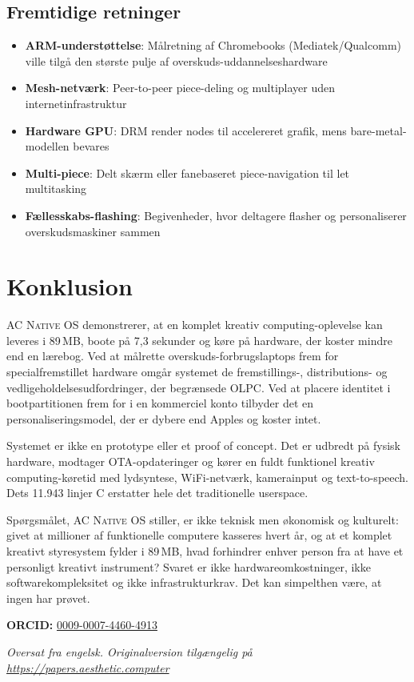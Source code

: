 \documentclass[10pt,letterpaper,twocolumn]{article}
\newcommand{\acos}{\textsc{AC Native OS}}
\begin{document}
\subsection{Fremtidige retninger}

\begin{itemize}
  \item \textbf{ARM-understøttelse}: Målretning af Chromebooks (Mediatek/Qualcomm) ville tilgå den største pulje af overskuds-uddannelseshardware
  \item \textbf{Mesh-netværk}: Peer-to-peer piece-deling og multiplayer uden internetinfrastruktur
  \item \textbf{Hardware GPU}: DRM render nodes til accelereret grafik, mens bare-metal-modellen bevares
  \item \textbf{Multi-piece}: Delt skærm eller fanebaseret piece-navigation til let multitasking
  \item \textbf{Fællesskabs-flashing}: Begivenheder, hvor deltagere flasher og personaliserer overskudsmaskiner sammen
\end{itemize}

\section{Konklusion}

\acos{} demonstrerer, at en komplet kreativ computing-oplevelse kan leveres i 89\,MB, boote på 7,3 sekunder og køre på hardware, der koster mindre end en lærebog. Ved at målrette overskuds-forbrugslaptops frem for specialfremstillet hardware omgår systemet de fremstillings-, distributions- og vedligeholdelsesudfordringer, der begrænsede OLPC. Ved at placere identitet i bootpartitionen frem for i en kommerciel konto tilbyder det en personaliseringsmodel, der er dybere end Apples og koster intet.

Systemet er ikke en prototype eller et proof of concept. Det er udbredt på fysisk hardware, modtager OTA-opdateringer og kører en fuldt funktionel kreativ computing-køretid med lydsyntese, WiFi-netværk, kamerainput og text-to-speech. Dets 11.943 linjer C erstatter hele det traditionelle userspace.

Spørgsmålet, \acos{} stiller, er ikke teknisk men økonomisk og kulturelt: givet at millioner af funktionelle computere kasseres hvert år, og at et komplet kreativt styresystem fylder i 89\,MB, hvad forhindrer enhver person fra at have et personligt kreativt instrument? Svaret er ikke hardwareomkostninger, ikke softwarekompleksitet og ikke infrastrukturkrav. Det kan simpelthen være, at ingen har prøvet.

\vspace{0.5em}
\noindent\textbf{ORCID:} \href{https://orcid.org/0009-0007-4460-4913}{0009-0007-4460-4913}

\vspace{0.5em}\noindent\textit{Oversat fra engelsk. Originalversion tilgængelig på \url{https://papers.aesthetic.computer}}



\end{document}
